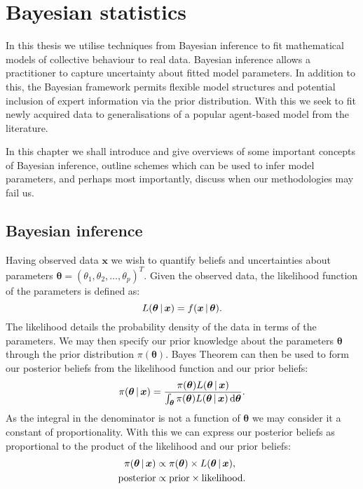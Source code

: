 \graphicspath{{fig/bayes_intro/}}

\chapter{Bayesian statistics}
\label{cha:bayes_intro}

In this thesis we utilise techniques from Bayesian inference to fit mathematical models of
collective behaviour to real data. Bayesian inference allows a practitioner to capture
uncertainty about fitted model parameters. In addition to this, the Bayesian framework
permits flexible model structures and potential inclusion of expert information via the
prior distribution. With this we seek to fit newly acquired data to generalisations of a
popular agent-based model from the literature.

In this chapter we shall introduce and give overviews of some important concepts of
Bayesian inference, outline schemes which can be used to infer model parameters, and
perhaps most importantly, discuss when our methodologies may fail us.

\section{Bayesian inference}
\label{sec:bayesian_inference}

Having observed data $\bm{x}$ we wish to quantify beliefs and uncertainties about
parameters $\bm{\theta} = (\theta_1, \theta_2,\dots,\theta_p)^T$. Given the observed
data, the likelihood function of the parameters is defined as:
\begin{equation}
	L(\bm{\theta}\,|\,\bm{x}) = f(\bm{x} \,|\, \bm{\theta}).
\end{equation}
The likelihood details the probability density of the data in terms of the
parameters. We may then specify our prior knowledge about the parameters $\bm{\theta}$
through the prior distribution $\pi(\bm{\theta})$. Bayes Theorem can then be used to form
our posterior beliefs from the likelihood function and our prior beliefs:
\begin{equation}
	\label{eq:bayes_theorem}
	\pi(\bm{\theta}\,|\,\bm{x}) =
	\frac{\pi({\bm{\theta}})L(\bm{\theta}\,|\,\bm{x})}{\int_{\bm{\theta}}
		\pi(\bm{\theta})L(\bm{\theta}\,|\,\bm{x}) \, \textup{d}\bm{\theta}}.
\end{equation}
As the integral in the denominator is not a function of $\bm{\theta}$ we may consider it a
constant of proportionality. With this we can express our posterior beliefs as
proportional to the product of the likelihood and our prior beliefs:
\begin{align*}
	\pi(\bm{\theta}\,|\,\bm{x}) & \propto \pi(\bm{\theta}) \times
	L(\bm{\theta}\,|\,\bm{x}),                                                   \\
	\text{posterior}             & \propto \text{prior} \times \text{likelihood}.
\end{align*}

